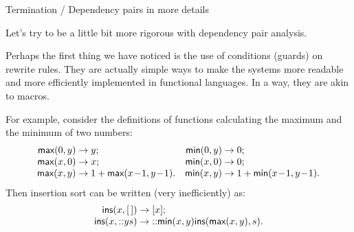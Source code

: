 %
\begin{frame}{Termination / Dependency pairs in more details}

  Let's try to be a little bit more rigorous with dependency pair
  analysis.

  \bigskip

  Perhaps the first thing we have noticed is the use of conditions
  (guards) on rewrite rules. They are actually simple ways to make the
  systems more readable and more efficiently implemented in functional
  languages. In a way, they are akin to macros.

  \bigskip

  For example, consider the definitions of functions calculating the
  maximum and the minimum of two numbers:
  \begin{equation*}
    \begin{array}{@{}r@{\;}l@{\;}lr@{\;}l@{\;}l@{}}
      \fun{max}(0,y) & \rightarrow & y; & \fun{min}(0,y) & \rightarrow & 0;\\
      \fun{max}(x,0) & \rightarrow & x; & \fun{min}(x,0) & \rightarrow & 0;\\
      \fun{max}(x,y) & \rightarrow & 1 + \fun{max}(x\!-\!1,y\!-\!1).
      & \fun{min}(x,y) & \rightarrow & 1 + \fun{min}(x\!-\!1,y\!-\!1).
    \end{array}
  \end{equation*}
  Then insertion sort can be written (very inefficiently) as:
  \begin{equation*}
    \begin{array}{@{}r@{\;}l@{\;}l@{}}
      \fun{ins}(x,\el) & \rightarrow & [x];\\
      \fun{ins}(x,\cons{y}{s}) & \rightarrow &
      \cons{\fun{min}(x,y)}{\fun{ins}(\fun{max}(x,y),s)}.
    \end{array}
  \end{equation*}

\end{frame}

